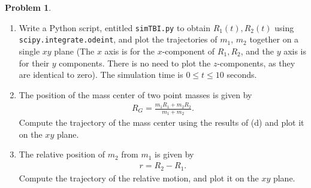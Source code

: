 \documentclass[10pt]{article}
\theoremstyle{definition}
\newtheorem{prob}{Problem}[section]
\newenvironment{subprob}%
{\renewcommand{\theenumi}{\alph{enumi}}\renewcommand{\labelenumi}{(\theenumi)}\begin{enumerate}}%
{\end{enumerate}}%
\begin{document}
\begin{prob}
\begin{subprob}
\item Write a Python script, entitled \texttt{simTBI.py} to obtain $R_1(t), R_2(t)$ using \texttt{scipy.integrate.odeint}, and plot the trajectories of $m_1$, $m_2$ together on a single $xy$ plane (The $x$ axis is for the $x$-component of $R_1,R_2$, and the $y$ axis is for their $y$ components. There is no need to plot the $z$-components, as they are identical to zero). The simulation time is $0\leq t \leq 10$ seconds.

\item The position of the mass center of two point masses is given by
\begin{align*}
 R_G = \frac{m_1  R_1 + m_2  R_2}{m_1+m_2}.
\end{align*}
Compute the trajectory of the mass center using the results of (d) and plot it on the $xy$ plane.


\item The relative position of $m_2$ from $m_1$ is given by
\begin{align*}
 r =  R_2 - R_1.
\end{align*}
Compute the trajectory of the relative motion, and plot it on the $xy$ plane.

\end{subprob}
\end{prob}
\end{document}
